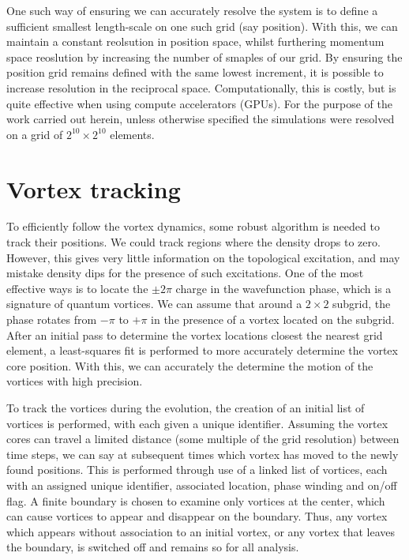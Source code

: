 One such way of ensuring we can accurately resolve the system is to define a sufficient smallest length-scale on one such grid (say position). With this, we can maintain a constant reolsution in position space, whilst furthering momentum space reoslution by increasing the number of smaples of our grid. By ensuring the position grid remains defined with the same lowest increment, it is possible to increase resolution in the reciprocal space. Computationally, this is costly, but is quite effective when using compute accelerators (GPUs). For the purpose of the work carried out herein, unless otherwise specified the simulations were resolved on a grid of $2^{10}\times 2^{10}$ elements.



 \section{Vortex tracking}
 To efficiently follow the vortex dynamics, some robust algorithm is needed to track their positions. We could track regions where the density drops to zero. However, this gives very little information on the topological excitation, and may mistake density dips for the presence of such excitations. One of the most effective ways is to locate the $\pm 2\pi$ charge in the wavefunction phase, which is a signature of quantum vortices. We can assume that around a $2\times 2$ subgrid, the phase rotates from $-\pi$ to $+\pi$ in the presence of a vortex located on the subgrid. After an initial pass to determine the vortex locations closest the nearest grid element, a least-squares fit is performed to more accurately determine the vortex core position. With this, we can accurately the determine the motion of the vortices with high precision.

 To track the vortices during the evolution, the creation of an initial list of vortices is performed, with each given a unique identifier. Assuming the vortex cores can travel a limited distance (some multiple of the grid resolution) between time steps, we can say at subsequent times which vortex has moved to the newly found positions. This is performed through use of a linked list of vortices, each with an assigned unique identifier, associated location, phase winding and on/off flag. A finite boundary is chosen to examine only vortices at the center, which can cause vortices to appear and disappear on the boundary. Thus, any vortex which appears without association to an initial vortex, or any vortex that leaves the boundary, is switched off and remains so for all analysis.
